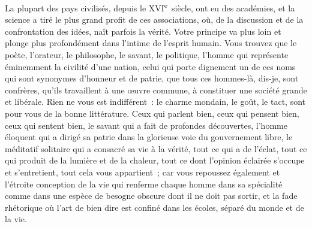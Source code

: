 \documentclass[french,twoside]{book} %
\begin{document}
La plupart des pays civilisés, depuis le XVI\textsuperscript{e} siècle, ont eu des académies, et la science a tiré le plus grand profit de ces associations, où, de la discussion et de la confrontation des idées, naît parfois la vérité. Votre principe va plus loin et plonge plus profondément dans l’intime de l’esprit humain. Vous trouvez que le poète, l’orateur, le philosophe, le savant, le politique, l’homme qui représente éminemment la civilité d’une nation, celui qui porte dignement un de ces noms qui sont synonymes d’honneur et de patrie, que tous ces hommes-là, dis-je, sont confrères, qu’ils travaillent à une œuvre commune, à constituer une société grande et libérale. Rien ne vous est indifférent : le charme mondain, le goût, le tact, sont pour vous de la bonne littérature. Ceux qui parlent bien, ceux qui pensent bien, ceux qui sentent bien, le savant qui a fait de profondes découvertes, l’homme éloquent qui a dirigé sa patrie dans la glorieuse voie du gouvernement libre, le méditatif solitaire qui a consacré sa vie à la vérité, tout ce qui a de l’éclat, tout ce qui produit de la lumière et de la chaleur, tout ce dont l’opinion éclairée s’occupe et s’entretient, tout cela vous appartient ; car vous repoussez également et l’étroite conception de la vie qui renferme chaque homme dans sa spécialité comme dans une espèce de besogne obscure dont il ne doit pas sortir, et la fade rhétorique où l’art de bien dire est confiné dans les écoles, séparé du monde et de la vie.\par
\end{document}
